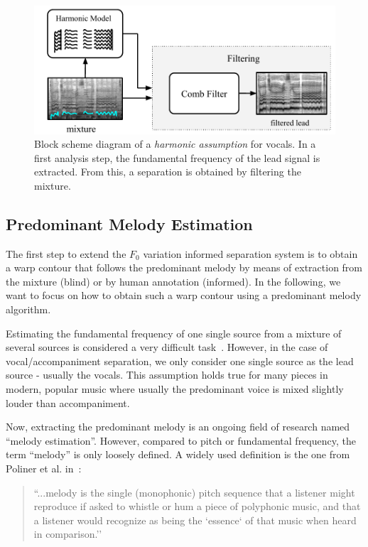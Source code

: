 \begin{figure}[htbp]
    \centering
  \includegraphics[width=\columnwidth]{Chapters/05_Separation_Known/figures/comb_filter.pdf}
    \caption{Block scheme diagram of a \textit{harmonic assumption} for vocals. In a first analysis step, the fundamental frequency of the lead signal is extracted. From this, a separation is obtained by filtering the mixture.}
    \label{fig:methods_harmonicity}
\end{figure}

\subsection{Predominant Melody Estimation}

The first step to extend the $F_0$ variation informed separation system is to obtain a warp contour that follows the predominant melody by means of extraction from the mixture (blind) or by human annotation (informed).
In the following, we want to focus on how to obtain such a warp contour using a predominant melody algorithm.\par

Estimating the fundamental frequency of one single source from a mixture of several sources is considered a very difficult task~\cite{klapuri08}.
However, in the case of vocal/accompaniment separation, we only consider one single source as the lead source - usually the vocals.
This assumption holds true for many pieces in modern, popular music where usually the predominant voice is mixed slightly louder than accompaniment.
\par
Now, extracting the predominant melody is an ongoing field of research named ``melody estimation''.
However, compared to pitch or fundamental frequency, the term ``melody'' is only loosely defined.
A widely used definition is the one from Poliner et al. in~\cite{poliner07}:

\begin{quote}
  ``...melody is the single (monophonic) pitch sequence that a listener might reproduce if asked to whistle or hum a piece of polyphonic music, and that a listener would recognize as being the `essence` of that music when heard in comparison.''
\end{quote}

